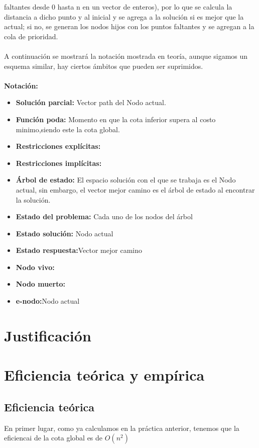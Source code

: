 \documentclass[11pt,openany]{book}
\begin{document}
faltantes desde 0 hasta n en un vector de enteros), por lo que se calcula la distancia a dicho punto y al inicial y se agrega a la solución si es 
mejor que la actual; si no, se generan los nodos hijos con los puntos faltantes y se agregan a la cola de prioridad.
\\ \\
A continuación se mostrará la notación mostrada en teoría, aunque sigamos un esquema similar, hay ciertos ámbitos que pueden ser suprimidos.
\\\\
\textbf{Notación:}
\begin{itemize}
      \item \textbf{Solución parcial:} Vector path del Nodo actual.
      \item \textbf{Función poda:} Momento en que la cota inferior supera al costo minimo,siendo este la cota global.
      \item \textbf{Restricciones explícitas:}
      \item \textbf{Restricciones implícitas:}
      \item \textbf{Árbol de estado:} El espacio solución con el que se trabaja es el Nodo actual, sin embargo, el 
      vector mejor camino es el árbol de estado al encontrar la solución.
      \item \textbf{Estado del problema:} Cada uno de los nodos del árbol
      \item \textbf{Estado solución:} Nodo actual
      \item \textbf{Estado respuesta:}Vector mejor camino
      \item \textbf{Nodo vivo:}
      \item \textbf{Nodo muerto:}
      \item \textbf{e-nodo:}Nodo actual
\end{itemize}


\newpage
\section{Justificación}

\newpage

\section{Eficiencia teórica y empírica}
\subsection{Eficiencia teórica}

En primer lugar, como ya calculamos en la práctica anterior, tenemos que la eficiencai de la cota global es de $O(n^2)$
\end{document}
